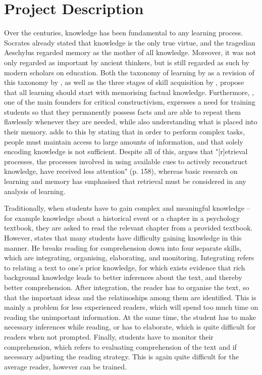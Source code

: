 \chapter{Project Description}

\label{ch:problem}

Over the centuries, knowledge has been fundamental to any learning process. Socrates already stated that knowledge is the only true virtue, and the tragedian Aeschylus regarded memory as the mother of all knowledge. Moreover, it was not only regarded as important by ancient thinkers, but is still regarded as such by modern scholars on education. Both the taxonomy of learning by  as a revision of this taxonomy by , as well as the three stages of skill acquisition by , propose that all learning should start with memorising factual knowledge. Furthermore, , one of the main founders for critical constructivism, expresses a need for training students so that they permanently possess facts and are able to repeat them flawlessly whenever they are needed, while also understanding what is placed into their memory.  adds to this by stating that in order to perform complex tasks, people must maintain access to large amounts of information, and that solely encoding knowledge is not sufficient. Despite all of this,  argues that "[r]etrieval processes, the processes involved in using available cues to actively reconstruct knowledge, have received less attention" (p. 158), whereas basic research on learning and memory has emphasised that retrieval must be considered in any analysis of learning.

Traditionally, when students have to gain complex and meaningful knowledge -- for example knowledge about a historical event or a chapter in a psychology textbook, they are asked to read the relevant chapter from a provided textbook. However,  states that many students have difficulty gaining knowledge in this manner. He breaks reading for comprehension down into four separate skills, which are integrating, organising, elaborating, and monitoring. Integrating refers to relating a text to one's prior knowledge, for which exists evidence that rich background knowledge leads to better inferences about the text, and thereby better comprehension. After integration, the reader has to organise the text, so that the important ideas and the relatinoships among them are identified. This is mainly a problem for less experienced readers, which will spend too much time on reading the unimportant information. At the same time, the student has to make necessary inferences while reading, or has to elaborate, which is quite difficult for readers when not prompted. Finally, students have to monitor their comprehension, which refers to evaluating comprehension of the text and if necessary adjusting the reading strategy. This is again quite difficult for the average reader, however can be trained.


